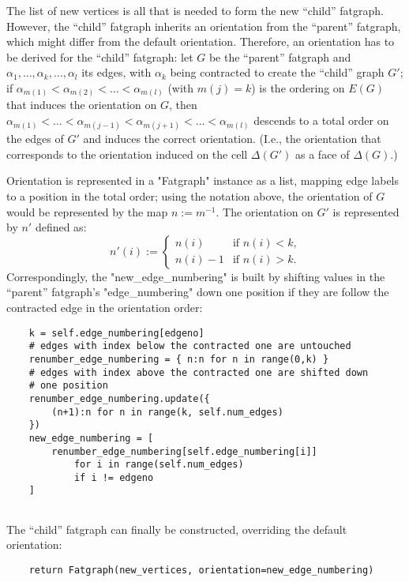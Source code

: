 The list of new vertices is all that is needed to form the new
``child'' fatgraph.  However, the ``child'' fatgraph inherits an
orientation from the ``parent'' fatgraph, which might differ from the
default orientation.  Therefore, an orientation has to be derived for
the ``child'' fatgraph: let $G$ be the ``parent'' fatgraph and
$\alpha_1, \ldots, \alpha_k, \ldots, \alpha_l$ its edges, with
$\alpha_k$ being contracted to create the ``child'' graph $G'$; if
$\alpha_{m(1)} < \alpha_{m(2)} < \ldots < \alpha_{m(l)}$ (with $m(j) = k$)
is the ordering on $E(G)$ that induces the orientation on $G$, then
$\alpha_{m(1)} < \ldots < \alpha_{m(j-1)} < \alpha_{m(j+1)} < \ldots
< \alpha_{m(l)}$ descends to a total order on the edges of $G'$ and
induces the correct orientation. (I.e., the orientation that
corresponds to the orientation induced on the cell $\Delta(G')$ as a
face of $\Delta(G)$.)

Orientation is represented in a "Fatgraph" instance as a list, mapping
edge labels to a position in the total order; using the notation
above, the orientation of $G$ would be represented by the map
$n := m^{-1}$.  The orientation on $G'$ is represented by $n'$ defined
as:
\begin{equation*}
  n'(i) :=
  \begin{cases}
    n(i)    &\text{if $n(i)<k$,} 
    \\
    n(i)-1  &\text{if $n(i)>k$.}
  \end{cases}
\end{equation*}
Correspondingly, the "new_edge_numbering" is built by shifting values
in the ``parent'' fatgraph's "edge_numbering" down one position if
they are follow the contracted edge in the orientation order:
\begin{lstlisting}
    k = self.edge_numbering[edgeno]
    # edges with index below the contracted one are untouched
    renumber_edge_numbering = { n:n for n in range(0,k) }
    # edges with index above the contracted one are shifted down
    # one position
    renumber_edge_numbering.update({ 
        (n+1):n for n in range(k, self.num_edges) 
    })
    new_edge_numbering = [ 
        renumber_edge_numbering[self.edge_numbering[i]]
            for i in range(self.num_edges)
            if i != edgeno 
    ]
    
\end{lstlisting}

The ``child'' fatgraph can finally be constructed, overriding the
default orientation:
\begin{lstlisting}
    return Fatgraph(new_vertices, orientation=new_edge_numbering)

\end{lstlisting}


